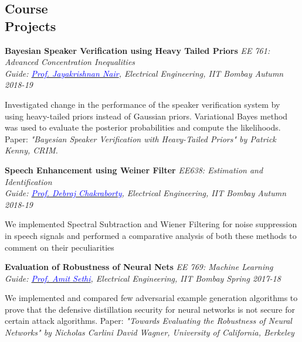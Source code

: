 \documentclass[margin,line, 9pt]{res}
\newenvironment{list1}{
  \begin{list}{\ding{113}}{%
      \setlength{\itemsep}{0in}
      \setlength{\parsep}{0in} \setlength{\parskip}{0in}
      \setlength{\topsep}{0in} \setlength{\partopsep}{0in} 
      \setlength{\leftmargin}{0.17in}}}{\end{list}}
\begin{document}
\begin{resume}
\section{\sc Course \\ Projects}
{\bf Bayesian Speaker Verification using Heavy Tailed Priors} \hfill {\it EE 761: Advanced Concentration Inequalities} \\
{\em Guide: \href{https://www.ee.iitb.ac.in/~jayakrishnan.nair/}{\textcolor{blue}{Prof. Jayakrishnan Nair}}, Electrical Engineering, IIT Bombay \hfill Autumn 2018-19} \\
\vspace*{-.15in}
\begin{list1}
\item[] Investigated change in the performance of the speaker verification system by using heavy-tailed priors instead of Gaussian priors. Variational Bayes method was used to evaluate the posterior probabilities and compute the likelihoods. Paper: \textit{"Bayesian Speaker Verification with Heavy-Tailed Priors" by Patrick Kenny, CRIM.} 
\end{list1}
% 
% 
{\bf Speech Enhancement using Weiner Filter} \hfill \textit{EE638: Estimation and Identification} \\
{\em Guide: \href{https://www.ee.iitb.ac.in/wiki/faculty/dc}{\textcolor{blue}{Prof. Debraj Chakraborty}}, Electrical Engineering, IIT Bombay \hfill Autumn 2018-19} \\
\vspace*{-.15in}
\begin{list1}
\item[] We implemented Spectral Subtraction and Wiener Filtering for noise suppression in speech signals and performed a comparative analysis of both these methods to comment on their peculiarities
\end{list1}
% 
{\bf Evaluation of Robustness of Neural Nets} \hfill {\it EE 769: Machine Learning} \\
{\em Guide: \href{https://www.ee.iitb.ac.in/~asethi/}{\textcolor{blue}{Prof. Amit Sethi}}, Electrical Engineering, IIT Bombay \hfill Spring 2017-18} \\
\vspace*{-.15in}
\begin{list1}
\item[] We implemented and compared few adversarial example generation algorithms to prove that the defensive distillation security for neural networks is not secure for certain attack algorithms. Paper: \textit{"Towards Evaluating the Robustness of Neural Networks" by Nicholas Carlini David Wagner, University of California, Berkeley} 

\end{list1}
\end{resume}
\end{document}
